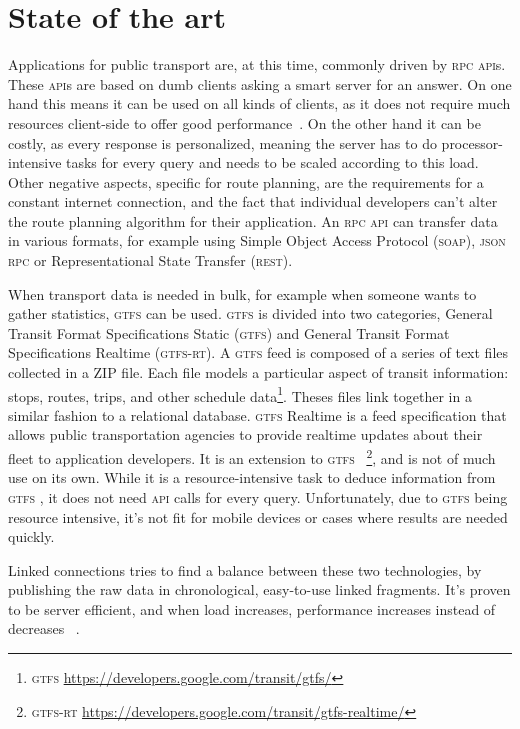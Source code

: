 \documentclass[twocolumn]{phdsymp} %
\begin{document}
\section{State of the art}
Applications for public transport are, at this time, commonly driven by \textsc{rpc} \textsc{api}s. These \textsc{api}s are based on dumb clients asking a smart server for an answer. On one hand this means it can be used on all kinds of clients, as it does not require much resources client-side to offer good performance~\cite{rpc}. On the other hand it can be costly, as every response is personalized, meaning the server has to do processor-intensive tasks for every query and needs to be scaled according to this load. Other negative aspects, specific for route planning, are the requirements for a constant internet connection, and the fact that individual developers can’t alter the route planning algorithm for their application. An \textsc{rpc} \textsc{api} can transfer data in various formats, for example using Simple Object Access Protocol (\textsc{soap}), \textsc{json} \textsc{rpc} or Representational State Transfer (\textsc{rest}). 

When transport data is needed in bulk, for example when someone wants to gather statistics, \textsc{gtfs}  can be used. \textsc{gtfs}  is divided into two categories, General Transit Format Specifications Static (\textsc{gtfs}) and General Transit Format Specifications Realtime (\textsc{gtfs-rt}). A \textsc{gtfs}  feed is composed of a series of text files collected in a ZIP file. Each file models a particular aspect of transit information: stops, routes, trips, and other schedule data\footnote{\textsc{gtfs} \url{https://developers.google.com/transit/gtfs/}}. Theses files link together in a similar fashion to a relational database. \textsc{gtfs}  Realtime is a feed specification that allows public transportation agencies to provide realtime updates about their fleet to application developers. It is an extension to \textsc{gtfs} ~\footnote{\textsc{gtfs-rt} \url{https://developers.google.com/transit/gtfs-realtime/}}, and is not of much use on its own.
While it is a resource-intensive task to deduce information from \textsc{gtfs} , it does not need \textsc{api} calls for every query. Unfortunately, due to \textsc{gtfs}  being resource intensive, it’s not fit for mobile devices or cases where results are needed quickly.

Linked connections tries to find a balance between these two technologies, by publishing the raw data in chronological, easy-to-use linked fragments. It’s proven to be server efficient, and when load increases, performance increases instead of decreases ~\cite{colpaert17}.
\end{document}
